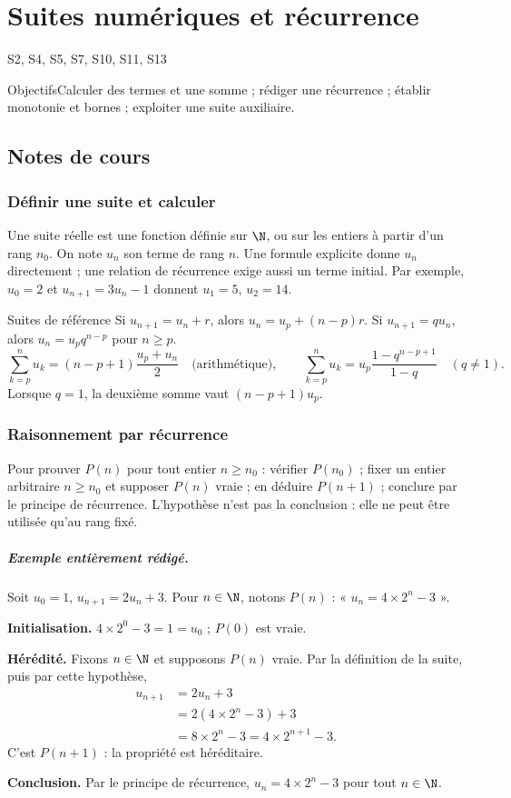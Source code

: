 \setcounter{chapter}{0}\chapter{Suites numériques et récurrence}\label{ch:1}

{\small\sffamily\color{teal}S2, S4, S5, S7, S10, S11, S13\par}

\begin{retenir}{Objectifs}Calculer des termes et une somme ; rédiger une récurrence ; établir monotonie et bornes ; exploiter une suite auxiliaire.\end{retenir}

\section{Notes de cours}
\subsection{Définir une suite et calculer}
Une suite réelle est une fonction définie sur $\N$, ou sur les entiers à partir d'un rang $n_0$. On note $u_n$ son terme de rang $n$. Une formule explicite donne $u_n$ directement ; une relation de récurrence exige aussi un terme initial. Par exemple, $u_0=2$ et $u_{n+1}=3u_n-1$ donnent $u_1=5$, $u_2=14$.
\begin{retenir}{Suites de référence}
Si $u_{n+1}=u_n+r$, alors $u_n=u_p+(n-p)r$. Si $u_{n+1}=qu_n$, alors $u_n=u_pq^{n-p}$ pour $n\ge p$.
\[\sum_{k=p}^n u_k=(n-p+1)\frac{u_p+u_n}{2}\quad\text{(arithmétique)},\qquad
\sum_{k=p}^n u_k=u_p\frac{1-q^{n-p+1}}{1-q}\quad(q\ne1).\]
Lorsque $q=1$, la deuxième somme vaut $(n-p+1)u_p$.
\end{retenir}
\subsection{Raisonnement par récurrence}
Pour prouver $P(n)$ pour tout entier $n\ge n_0$ : vérifier $P(n_0)$ ; fixer un entier arbitraire $n\ge n_0$ et supposer $P(n)$ vraie ; en déduire $P(n+1)$ ; conclure par le principe de récurrence. L'hypothèse n'est pas la conclusion : elle ne peut être utilisée qu'au rang fixé.
\paragraph{Exemple entièrement rédigé.} Soit $u_0=1$, $u_{n+1}=2u_n+3$. Pour $n\in\N$, notons $P(n)$ : « $u_n=4\times2^n-3$ ».
\par\smallskip\textbf{Initialisation.} $4\times2^0-3=1=u_0$ ; $P(0)$ est vraie.
\par\smallskip\textbf{Hérédité.} Fixons $n\in\N$ et supposons $P(n)$ vraie. Par la définition de la suite, puis par cette hypothèse,
\[\begin{aligned}u_{n+1}&=2u_n+3\\&=2(4\times2^n-3)+3\\&=8\times2^n-3=4\times2^{n+1}-3.\end{aligned}\]
C'est $P(n+1)$ : la propriété est héréditaire.
\par\smallskip\textbf{Conclusion.} Par le principe de récurrence, $u_n=4\times2^n-3$ pour tout $n\in\N$.

